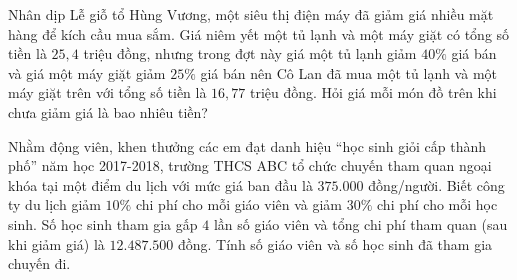 \begin{bt}%
	Nhân dịp Lễ giỗ tổ Hùng Vương, một siêu thị điện máy đã giảm giá nhiều mặt hàng để kích cầu mua sắm. Giá niêm yết một tủ lạnh và một máy giặt có tổng số tiền là $ 25{,}4 $ triệu đồng, nhưng trong đợt này giá một tủ lạnh giảm $ 40\% $ giá bán và giá một máy giặt giảm $ 25\% $ giá bán nên Cô Lan đã mua một tủ lạnh và một máy giặt trên với tổng số tiền là $ 16{,}77 $ triệu đồng. Hỏi giá mỗi món đồ trên khi chưa giảm giá là bao nhiêu tiền?
\end{bt}



\begin{bt}%
	Nhằm động viên, khen thưởng các em đạt danh hiệu ``học sinh giỏi cấp thành phố'' năm học 2017-2018, trường THCS ABC tổ chức chuyến tham quan ngoại khóa tại một điểm du lịch với mức giá ban đầu là $375.000$ đồng/người. Biết công ty du lịch giảm $10\%$ chi phí cho mỗi giáo viên và giảm $30\%$ chi phí cho mỗi học sinh. Số học sinh tham gia gấp $4$ lần số giáo viên và tổng chi phí tham quan (sau khi giảm giá) là $12.487.500$ đồng. Tính số giáo viên và số học sinh đã tham gia chuyến đi.
\end{bt}


